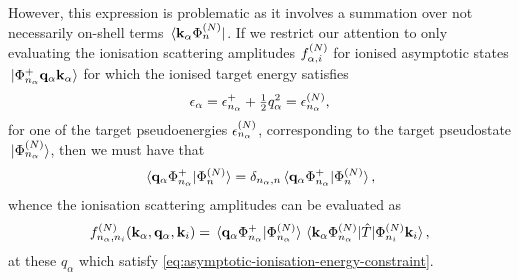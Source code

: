 \documentclass[draft]{article}
\begin{document}
However, this expression is problematic as it involves a summation over
not necessarily on-shell terms $\bra*{\vb{k}_{\alpha}\Phi_{n}^{(N)}}$.
If we restrict our attention to only evaluating the ionisation scattering
amplitudes $f_{\alpha, i}^{(N)}$ for ionised asymptotic states
$\ket*{\Phi_{n_{\alpha}}^{+} \vb{q}_{\alpha} \vb{k}_{\alpha}}$ for which the
ionised target energy satisfies
\begin{equation}
  \label{eq:asymptotic-ionisation-energy-constraint}
  \epsilon_{\alpha}
  =
  \epsilon_{n_{\alpha}}^{+}
  +
  \tfrac{1}{2}
  q_{\alpha}^{2}
  =
  \epsilon_{n_{\alpha}}^{(N)}
  ,
\end{equation}
for one of the target pseudoenergies $\epsilon_{n_{\alpha}}^{(N)}$,
corresponding to the target pseudostate $\ket*{\Phi_{n_{\alpha}}^{(N)}}$, then
we must have that
\begin{equation}
  \label{eq:asymptotic-ionisation-overlap}
  \braket*
  {\vb{q}_{\alpha} \Phi_{n_{\alpha}}^{+}}
  {\Phi_{n}^{(N)}}
  =
  \delta_{n_{\alpha}, n}
  \braket*
  {\vb{q}_{\alpha} \Phi_{n_{\alpha}}^{+}}
  {\Phi_{n}^{(N)}}
  ,
\end{equation}
whence the ionisation scattering amplitudes can be evaluated as
\begin{equation}
  \label{eq:scattering-amplitude-ionisation-evaluated}
  f_{n_{\alpha}, n_{i}}^{(N)}(
    \vb{k}_{\alpha}, \vb{q}_{\alpha}, \vb{k}_{i}
  )
  =
  \braket*
  {\vb{q}_{\alpha} \Phi_{n_{\alpha}}^{+}}
  {\Phi_{n_{\alpha}}^{(N)}}
  \mel*
  {\vb{k}_{\alpha} \Phi_{n_{\alpha}}^{(N)}}
  {\hat{T}}
  {\Phi_{n_{i}}^{(N)} \vb{k}_{i}}
  ,
\end{equation}
at these $q_{\alpha}$ which satisfy
\autoref{eq:asymptotic-ionisation-energy-constraint}.
\end{document}
